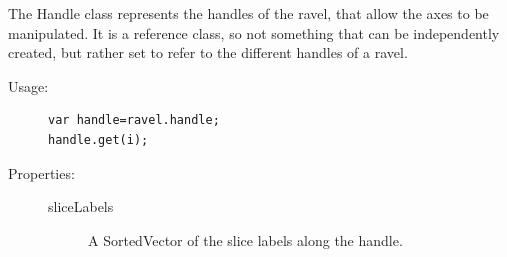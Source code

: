 \documentclass{article}
\begin{document}
The Handle class represents the handles of the ravel, that allow the
axes to be manipulated. It is a reference class, so not something that
can be independently created, but rather set to refer to the different
handles of a ravel.

\begin{description}
\item[Usage:]\mbox{}
\begin{verbatim}
var handle=ravel.handle;
handle.get(i);
\end{verbatim}

\item[Properties:]\mbox{}
\begin{description}
\item[sliceLabels] A SortedVector of the slice labels along the handle.
\end{description}


\end{description}
\end{document}
